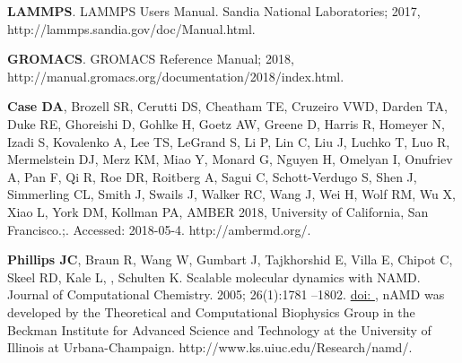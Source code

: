 \documentclass[9pt,bestpractices]{livecoms}
\providecommand{\DIFaddbegin}{} %
\providecommand{\DIFaddend}{} %
\providecommand{\DIFdelbegin}{} %
\providecommand{\DIFdelend}{} %
\begin{document}
\DIFdelbegin %
\DIFdelend \DIFaddbegin \begin{thebibliography}{61}
	\DIFaddend \providecommand{\natexlab}[1]{#1}
	\providecommand{\urlprefix}{}
	\providecommand{\doiprefix}{doi: }
	
	\textbf{\color{LiveCoMSMediumGrey} LAMMPS}.
	\newblock LAMMPS Users Manual.
	\newblock Sandia National Laboratories; 2017,
	http://lammps.sandia.gov/doc/Manual.html.
	
	\textbf{\color{LiveCoMSMediumGrey} GROMACS}.
	\newblock GROMACS Reference Manual; 2018,
	http://manual.gromacs.org/documentation/2018/index.html.
	
	\textbf{\color{LiveCoMSMediumGrey} Case DA}, Brozell SR, Cerutti DS, Cheatham
	TE, Cruzeiro VWD, Darden TA, Duke RE, Ghoreishi D, Gohlke H, Goetz AW, Greene
	D, Harris R, Homeyer N, Izadi S, Kovalenko A, Lee TS, LeGrand S, Li P, Lin C,
	Liu J, Luchko T, Luo R, Mermelstein DJ, Merz KM, Miao Y, Monard G, Nguyen H,
	Omelyan I, Onufriev A, Pan F, Qi R, Roe DR, Roitberg A, Sagui C,
	Schott-Verdugo S, Shen J, Simmerling CL, Smith J, Swails J, Walker RC, Wang
	J, Wei H, Wolf RM, Wu X, Xiao L, York DM, Kollman PA, {AMBER 2018, University
		of California, San Francisco.};.
	\newblock Accessed: 2018-05-4.
	\newblock http://ambermd.org/.
	
	\textbf{\color{LiveCoMSMediumGrey} Phillips JC}, Braun R, Wang W, Gumbart J,
	Tajkhorshid E, Villa E, Chipot C, Skeel RD, Kale L, , Schulten K.
	\newblock Scalable molecular dynamics with NAMD.
	\newblock Journal of Computational Chemistry.  2005; 26(1):1781 --1802.
	\newblock \href{https://dx.doi.org/10.1002/jcc.20289}{\doiprefix
		}, nAMD was developed by the Theoretical and
	Computational Biophysics Group in the Beckman Institute for Advanced Science
	and Technology at the University of Illinois at Urbana-Champaign.
	http://www.ks.uiuc.edu/Research/namd/.
	

\end{thebibliography}
\end{document}

